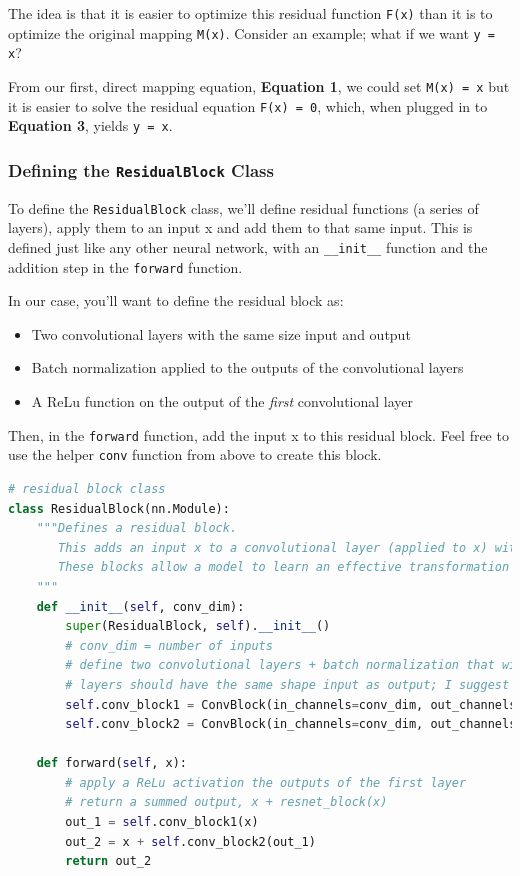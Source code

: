 The idea is that it is easier to optimize this residual function
\lstinline{F(x)} than it is to optimize the original
mapping \lstinline{M(x)}. Consider an example; what if we
want \lstinline{y = x}? \newline

From our first, direct mapping equation, \textbf{Equation 1}, we could
set \lstinline{M(x) = x} but it is easier to solve the
residual equation \lstinline{F(x) = 0}, which, when
plugged in to \textbf{Equation 3}, yields
\lstinline{y = x}.

\subsubsection{\texorpdfstring{Defining the \texttt{ResidualBlock} Class}{Defining the ResidualBlock Class}}

To define the \lstinline{ResidualBlock} class, we'll
define residual functions (a series of layers), apply them to an input x
and add them to that same input. This is defined just like any other
neural network, with an \lstinline{__init__} function
and the addition step in the \lstinline{forward} function. \newline

In our case, you'll want to define the residual block as: 
\begin{itemize}
    \item Two convolutional layers with the same size input and output
    \item Batch normalization applied to the outputs of the convolutional layers
    \item A ReLu function on the output of the \emph{first} convolutional layer
\end{itemize}

Then, in the \lstinline{forward} function, add the input x
to this residual block. Feel free to use the helper
\lstinline{conv} function from above to create this block.

\begin{lstlisting}[language=Python]
# residual block class
class ResidualBlock(nn.Module):
    """Defines a residual block.
       This adds an input x to a convolutional layer (applied to x) with the same size input and output.
       These blocks allow a model to learn an effective transformation from one domain to another.
    """
    def __init__(self, conv_dim):
        super(ResidualBlock, self).__init__()
        # conv_dim = number of inputs
        # define two convolutional layers + batch normalization that will act as our residual function, F(x)
        # layers should have the same shape input as output; I suggest a kernel_size of 3
        self.conv_block1 = ConvBlock(in_channels=conv_dim, out_channels=conv_dim, kernel_size=3)
        self.conv_block2 = ConvBlock(in_channels=conv_dim, out_channels=conv_dim, kernel_size=3, use_activation=False)
        
    def forward(self, x):
        # apply a ReLu activation the outputs of the first layer
        # return a summed output, x + resnet_block(x)
        out_1 = self.conv_block1(x)
        out_2 = x + self.conv_block2(out_1)
        return out_2
\end{lstlisting}

